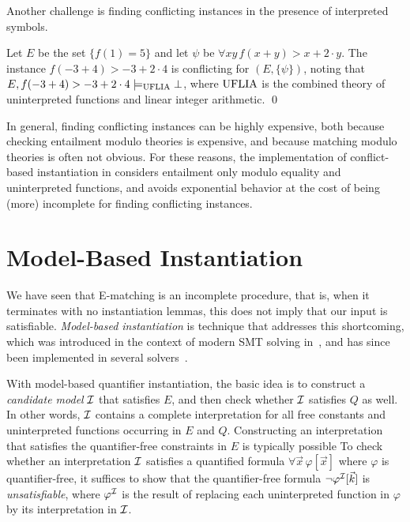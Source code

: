 \documentclass[oribibl]{llncs}
\begin{document}
Another challenge is finding conflicting instances in the presence of interpreted symbols.
\begin{example}
Let $E$ be the set $\{ f( 1 ) = 5 \}$ and let $\psi$ be $\forall xy\, f( x + y ) > x + 2 \cdot y$.
The instance $f( -3 + 4 ) > -3 + 2 \cdot 4$ is conflicting for $( E, \{ \psi \} )$,
noting that $E, f( -3 + 4 ) > -3 + 2 \cdot 4 \models_{\mathrm{UFLIA}} \bot$, where $\mathrm{UFLIA}$ is the combined
theory of uninterpreted functions and linear integer arithmetic.
\qed
\end{example}
In general, finding conflicting instances can be highly expensive, both because checking entailment modulo theories is expensive,
and because matching modulo theories is often not obvious.
For these reasons,
the implementation of conflict-based instantiation in \cvc
considers entailment only modulo equality and uninterpreted functions,
and avoids exponential behavior at the cost of being (more) incomplete for finding conflicting instances. 

\section{Model-Based Instantiation}
\label{sec:mbqi}

We have seen that E-matching is an incomplete procedure,
that is, when it terminates with no instantiation lemmas, this does not imply that our input is satisfiable.
\emph{Model-based instantiation} is technique that addresses this shortcoming,
which was introduced in the context of modern SMT solving in~\cite{},
and has since been implemented in several solvers~\cite{}.

With model-based quantifier instantiation, the basic idea is
to construct a \emph{candidate model} $\mathcal{I}$ that satisfies $E$, 
and then check whether $\mathcal{I}$ satisfies $Q$ as well.
In other words, $\mathcal{I}$ contains a complete interpretation for all free constants and uninterpreted functions occurring in $E$ and $Q$.
Constructing an interpretation that satisfies the quantifier-free constraints in $E$
is typically possible 
To check whether an interpretation $\mathcal{I}$ satisfies a quantified formula $\forall \vec x\, \varphi[ \vec x ]$ where $\varphi$ is quantifier-free,
it suffices to show that the quantifier-free formula $\neg \varphi^{\mathcal{I}}[ \vec k ]$ is \emph{unsatisfiable},
where $\varphi^{\mathcal{I}}$ is the result of replacing each uninterpreted function in $\varphi$
by its interpretation in $\mathcal{I}$.

\begin{example}

\end{example}
\end{document}
